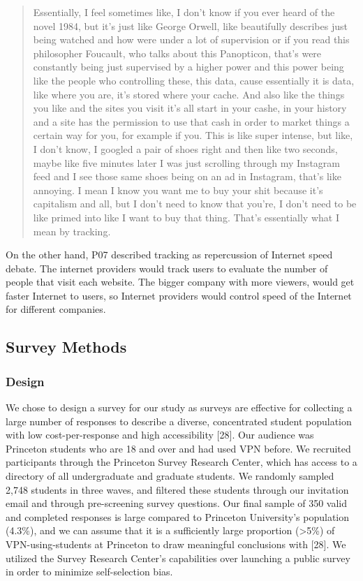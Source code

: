 \begin{quote} 
Essentially, I feel sometimes like, I don't know if you ever heard of the novel 1984, but it's just like George Orwell, like beautifully describes just being watched and how were under a lot of supervision or if you read this philosopher Foucault, who talks about this Panopticon, that's were constantly being just supervised by a higher power and this power being like the people who controlling these, this data, cause essentially it is data, like where you are, it's stored where your cache. And also like the things you like and the sites you visit it's all start in your cashe, in your history and a site has the permission to use that cash in order to market things a certain way for you, for example if you. This is like super intense, but like, I don't know, I googled a pair of shoes right and then like two seconds, maybe like five minutes later I was just scrolling through my Instagram feed and I see those same shoes being on an ad in Instagram, that's like annoying. I mean I know you want me to buy your shit because it's capitalism and all, but I don't need to know that you're, I don't need to be like primed into like I want to buy that thing. That's essentially what I mean by tracking.\end{quote}

On the other hand, P07 described tracking as repercussion of Internet speed debate. The internet providers would track users to evaluate the number of people that visit each website. The bigger company with more viewers, would get faster Internet to users, so Internet providers would control speed of the Internet for different companies. 





\subsection{Survey Methods}
\subsubsection{Design}

We chose to design a survey for our study as surveys are effective for collecting a large number of responses to describe a diverse, concentrated student population with low cost-per-response and high accessibility [28]. Our audience was Princeton students who are 18 and over and had used VPN before. We recruited participants through the Princeton Survey Research Center, which has access to a directory of all undergraduate and graduate students. We randomly sampled 2,748 students in three waves, and filtered these students through our invitation email and through pre-screening survey questions. Our final sample of 350 valid and completed responses is large compared to Princeton University's population (4.3\%), and we can assume that it is a sufficiently large proportion (>5\%) of VPN-using-students at Princeton to draw meaningful conclusions with [28]. We utilized the Survey Research Center's capabilities over launching a public survey in order to minimize self-selection bias.

